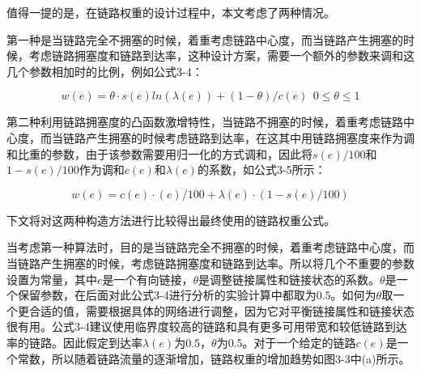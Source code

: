值得一提的是，在链路权重的设计过程中，本文考虑了两种情况。

第一种是当链路完全不拥塞的时候，着重考虑链路中心度，而当链路产生拥塞的时候，考虑链路拥塞度和链路到达率，这种设计方案，需要一个额外的参数来调和这几个参数相加时的比例，例如公式3-4：

\begin{equation} \label{first link weight equation}
    w(e)=\theta \cdot s(e)ln(λ(e)) +(1- \theta )/c(e) \ \  0 \le \theta \le 1
\end{equation}

第二种利用链路拥塞度的凸函数激增特性，当链路不拥塞的时候，着重考虑链路中心度，而当链路产生拥塞的时候考虑链路到达率，在这其中用链路拥塞度来作为调和比重的参数，由于该参数需要用归一化的方式调和，因此将$s(e)/100$和$1-s(e)/100$作为调和$c(e)$和$\lambda(e)$的系数，如公式3-5所示：

\begin{equation} \label{second link weight equation}
    w(e) = c(e) \cdot (e)/100 + \lambda(e) \cdot (1-s(e)/100)
\end{equation}

下文将对这两种构造方法进行比较得出最终使用的链路权重公式。

当考虑第一种算法时，目的是当链路完全不拥塞的时候，着重考虑链路中心度，而当链路产生拥塞的时候，考虑链路拥塞度和链路到达率。所以将几个不重要的参数设置为常量，其中$e$是一个有向链接，$\theta$是调整链接属性和链接状态的系数。$\theta$是一个保留参数，在后面对此公式3-4进行分析的实验计算中都取为$0.5$。如何为$\theta$取一个更合适的值，需要根据具体的网络进行调整，因为它对平衡链接属性和链接状态很有用。公式3-4建议使用临界度较高的链路和具有更多可用带宽和较低链路到达率的链路。因此假定到达率$\lambda\left(e\right)$为$0.5$，$\theta$为$0.5$。对于一个给定的链路$c\left(e\right)$是一个常数，所以随着链路流量的逐渐增加，链路权重的增加趋势如图3-3中(a)所示。


